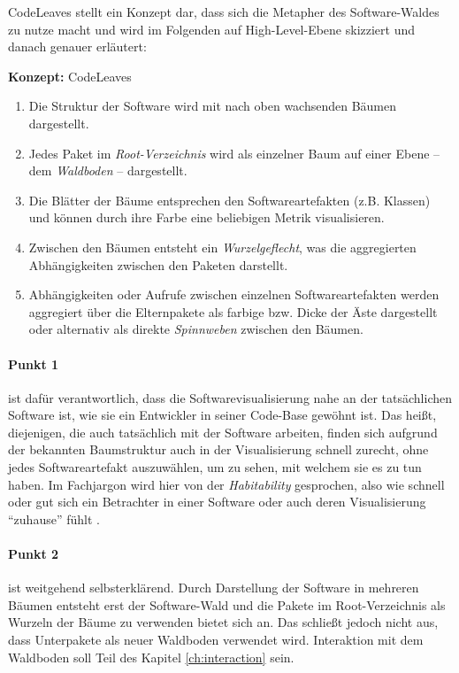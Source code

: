CodeLeaves stellt ein Konzept dar, dass sich die Metapher des Software-Waldes zu nutze macht und wird im Folgenden auf High-Level-Ebene skizziert und danach genauer erläutert:

\begin{titlebox}{\textbf{Konzept:} CodeLeaves}
  \begin{enumerate}
    \item Die Struktur der Software wird mit nach oben wachsenden Bäumen dargestellt.
    \item Jedes Paket im \emph{Root-Verzeichnis} wird als einzelner Baum auf einer Ebene -- dem \emph{Waldboden} -- dargestellt.
    \item Die Blätter der Bäume entsprechen den Softwareartefakten (z.B. Klassen) und können durch ihre Farbe eine beliebigen Metrik visualisieren. 
    \item Zwischen den Bäumen entsteht ein \emph{Wurzelgeflecht}, was die aggregierten Abhängigkeiten zwischen den Paketen darstellt.
    \item Abhängigkeiten oder Aufrufe zwischen einzelnen Softwareartefakten werden aggregiert über die Elternpakete als farbige bzw. Dicke der Äste dargestellt oder alternativ als direkte \emph{Spinnweben} zwischen den Bäumen.
  \end{enumerate}
\end{titlebox}

\paragraph{Punkt 1} ist dafür verantwortlich, dass die Softwarevisualisierung nahe an der tatsächlichen Software ist, wie sie ein Entwickler in seiner Code-Base gewöhnt ist. Das heißt, diejenigen, die auch tatsächlich mit der Software arbeiten, finden sich aufgrund der bekannten Baumstruktur auch in der Visualisierung schnell zurecht, ohne jedes Softwareartefakt auszuwählen, um zu sehen, mit welchem sie es zu tun haben. Im Fachjargon wird hier von der \emph{Habitability} gesprochen, also wie schnell oder gut sich ein Betrachter in einer Software oder auch deren Visualisierung "`zuhause"' fühlt \cite{wettel2007program}.

\paragraph{Punkt 2} ist weitgehend selbsterklärend. Durch Darstellung der Software in mehreren Bäumen entsteht erst der Software-Wald und die Pakete im Root-Verzeichnis als Wurzeln der Bäume zu verwenden bietet sich an. Das schließt jedoch nicht aus, dass Unterpakete als neuer Waldboden verwendet wird. Interaktion mit dem Waldboden soll Teil des Kapitel \ref{ch:interaction} sein.

